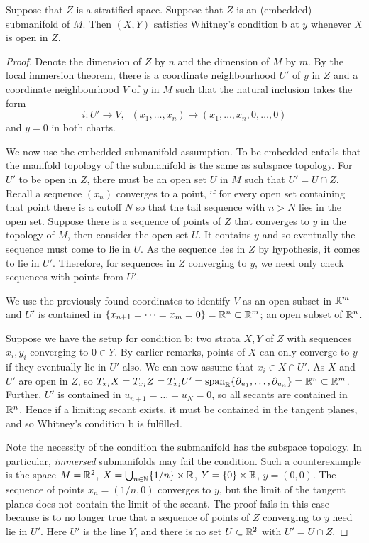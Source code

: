 \begin{lem}
    \label{lem:cond_b_pair}
Suppose that $Z$ is a stratified space. Suppose that $Z$ is an (embedded) submanifold of $M$. Then $(X,Y)$ satisfies Whitney's condition b at $y$ whenever $X$ is open in $Z$.
\begin{proof}
Denote the dimension of $Z$ by $n$ and the dimension of $M$ by $m$. By the local immersion theorem, there is a coordinate neighbourhood $U'$ of $y$ in $Z$ and a coordinate neighbourhood $V$ of $y$ in $M$ such that the natural inclusion takes the form
\[
i : U' \to V, \;\; (x_1, \dots, x_n) \mapsto (x_1, \dots, x_n, 0, \dots, 0)
\]
and $y=0$ in both charts.

We now use the embedded submanifold assumption. To be embedded entails that the manifold topology of the submanifold is the same as subspace topology. For $U'$ to be open in $Z$, there must be an open set $U$ in $M$ such that $U' = U \cap Z$. Recall a sequence $(x_n)$ converges to a point, if for every open set containing that point there is a cutoff $N$ so that the tail sequence with $n>N$ lies in the open set. Suppose there is a sequence of points of $Z$ that converges to $y$ in the topology of $M$, then consider the open set $U$. It contains $y$ and so eventually the sequence must come to lie in $U$. As the sequence lies in $Z$ by hypothesis, it comes to lie in $U'$. Therefore, for sequences in $Z$ converging to $y$, we need only check sequences with points from $U'$.

We use the previously found coordinates to identify $V$ as an open subset in $\mathbb{R}^m$ and $U'$ is contained in $\{x_{n+1}=\dots = x_{m} = 0\} = \mathbb{R}^n \subset \mathbb{R}^m$; an open subset of $\mathbb{R}^n$.

Suppose we have the setup for condition b; two strata $X,Y$ of $Z$ with sequences $x_i, y_i$ converging to $0\in Y$. By earlier remarks, points of $X$ can only converge to $y$ if they eventually lie in $U'$ also. We can now assume that $x_i \in X\cap U'$. As $X$ and $U'$ are open in $Z$, so $T_{x_i} X = T_{x_i} Z = T_{x_i} U' = \text{span}_{\mathbb{R}} \{ \partial_{u_1}, \dots, \partial_{u_n} \} = \mathbb{R}^n \subset \mathbb{R}^m$. Further, $U'$ is contained in $u_{n+1}=\dots = u_{N} = 0$, so all secants are contained in $\mathbb{R}^n$. Hence if a limiting secant exists, it must be contained in the tangent planes, and so Whitney's condition b is fulfilled.

Note the necessity of the condition the submanifold has the subspace topology. In particular, \emph{immersed} submanifolds may fail the condition. Such a counterexample is the space $M = \mathbb{R}^2$, $X = \bigcup_{n\in \mathbb{N}} \{1/n\} \times \mathbb{R}$, $Y = \{0\}\times \mathbb{R}$, $y=(0,0)$. The sequence of points $x_n = (1/n, 0)$ converges to $y$, but the limit of the tangent planes does not contain the limit of the secant. The proof fails in this case because is to no longer true that a sequence of points of $Z$ converging to $y$ need lie in $U'$. Here $U'$ is the line $Y$, and there is no set $U\subset \mathbb{R}^2$ with $U' = U \cap Z$.
\end{proof}
\end{lem}







